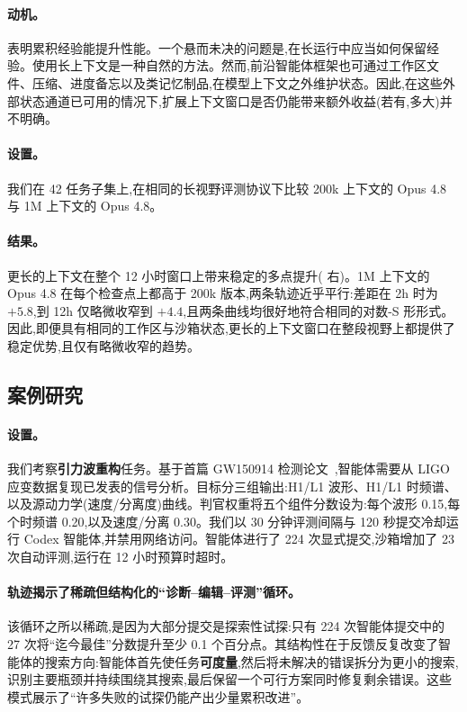 \paragraph{动机。}  表明累积经验能提升性能。一个悬而未决的问题是,在长运行中应当如何保留经验。使用长上下文是一种自然的方法。然而,前沿智能体框架也可通过工作区文件、压缩、进度备忘以及类记忆制品,在模型上下文之外维护状态。因此,在这些外部状态通道已可用的情况下,扩展上下文窗口是否仍能带来额外收益(若有,多大)并不明确。

\paragraph{设置。} 我们在 42 任务子集上,在相同的长视野评测协议下比较 200k 上下文的 Opus 4.8 与 1M 上下文的 Opus 4.8。

\paragraph{结果。} 更长的上下文在整个 12 小时窗口上带来稳定的多点提升( 右)。1M 上下文的 Opus 4.8 在每个检查点上都高于 200k 版本,两条轨迹近乎平行:差距在 2h 时为 $+5.8$,到 12h 仅略微收窄到 $+4.4$,且两条曲线均很好地符合相同的对数-S 形形式。因此,即便具有相同的工作区与沙箱状态,更长的上下文窗口在整段视野上都提供了稳定优势,且仅有略微收窄的趋势。

\subsection{案例研究}
\label{sec:case-study}

\paragraph{设置。} 我们考察\textbf{引力波重构}任务。基于首篇 GW150914 检测论文~\cite{abbott2016gw150914},智能体需要从 LIGO 应变数据复现已发表的信号分析。目标分三组输出:H1/L1 波形、H1/L1 时频谱、以及源动力学(速度/分离度)曲线。判官权重将五个组件分数设为:每个波形 0.15,每个时频谱 0.20,以及速度/分离 0.30。我们以 30 分钟评测间隔与 120 秒提交冷却运行 Codex 智能体,并禁用网络访问。智能体进行了 224 次显式提交,沙箱增加了 23 次自动评测,运行在 12 小时预算时超时。

\paragraph{轨迹揭示了稀疏但结构化的``诊断--编辑--评测''循环。} 该循环之所以稀疏,是因为大部分提交是探索性试探:只有 224 次智能体提交中的 27 次将``迄今最佳''分数提升至少 0.1 个百分点。其结构性在于反馈反复改变了智能体的搜索方向:智能体首先使任务\textbf{可度量},然后将未解决的错误拆分为更小的搜索,识别主要瓶颈并持续围绕其搜索,最后保留一个可行方案同时修复剩余错误。这些模式展示了``许多失败的试探仍能产出少量累积改进''。

